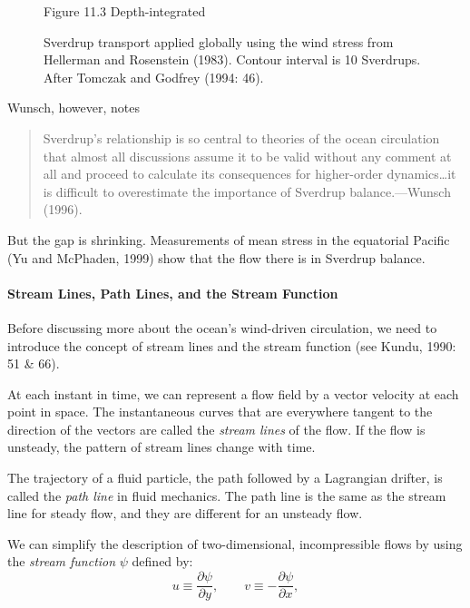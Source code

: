 \begin{enumerate}
\begin{figure}[t!]
\footnotesize
Figure 11.3 Depth-integrated \rule{0mm}{3ex}Sverdrup transport  applied globally using the wind stress
from Hellerman and Rosenstein (1983). Contour interval is 10 Sverdrups. After Tomczak and
Godfrey (1994: 46).
\label{fig:sverdrupxport}
\vspace{-4ex}
\end{figure}

Wunsch, however, notes
\begin{quote} \small
Sverdrup's relationship is so central to theories of the ocean circulation that
almost all discussions assume it to be valid without any comment at all and proceed
to calculate its consequences for higher-order dynamics\dots it is difficult to
overestimate the importance of Sverdrup balance.---Wunsch (1996).
\end{quote}
But the gap is shrinking. Measurements of mean stress in the equatorial
Pacific (Yu and McPhaden, 1999) show that the flow there is in Sverdrup balance.
\end{enumerate}

\vspace{-2ex}
\paragraph{Stream Lines, Path Lines, and the Stream Function}
Before discussing more about the ocean's wind-driven circulation, we need to introduce the concept of stream lines
and the stream function (see Kundu, 1990: 51 \& 66).

At each instant in time, we can represent a flow field by a vector velocity
at each point in space. The instantaneous curves that are everywhere tangent to the
direction of the vectors are called the \textit{stream lines} of the flow. If the flow is unsteady, the pattern of stream lines change
with time.

The trajectory of a fluid particle, the path followed by a Lagrangian drifter, is called the \textit{path
line} in fluid mechanics. The path line is the same as the stream line for steady flow, and
they are different for an unsteady flow.

We can simplify the description of two-dimensional, incompressible flows by using the \textit{stream
function} $\psi$ defined by:
\begin{equation}
u \equiv \frac{\partial{\psi}}{\partial{y}}, \qquad v \equiv -
\frac{\partial{\psi}}{\partial{x}},
\end{equation}

